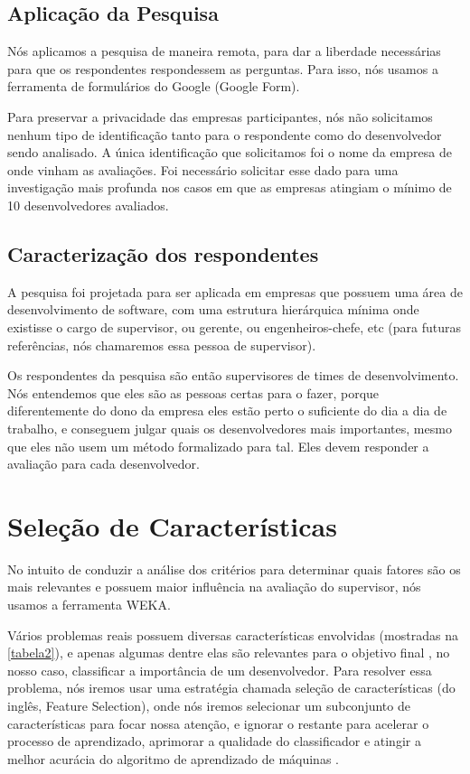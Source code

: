 \subsection{Aplicação da Pesquisa}

Nós aplicamos a pesquisa de maneira remota, para dar a liberdade necessárias para que os respondentes respondessem as perguntas. Para isso, nós usamos a ferramenta de formulários do Google (Google Form).

Para preservar a privacidade das empresas participantes, nós não solicitamos nenhum tipo de identificação tanto para o respondente como do desenvolvedor sendo analisado. A única identificação que solicitamos foi o nome da empresa de onde vinham as avaliações. Foi necessário solicitar esse dado para uma investigação mais profunda nos casos em que as empresas atingiam o mínimo de 10 desenvolvedores avaliados.

\subsection{Caracterização dos respondentes}

A pesquisa foi projetada para ser aplicada em empresas que possuem uma área de desenvolvimento de software, com uma estrutura hierárquica mínima onde existisse o cargo de supervisor, ou gerente, ou engenheiros-chefe, etc (para futuras referências, nós chamaremos essa pessoa de supervisor).

Os respondentes da pesquisa são então supervisores de times de desenvolvimento. Nós entendemos que eles são as pessoas certas para o fazer, porque diferentemente do dono da empresa eles estão perto o suficiente do dia a dia de trabalho, e conseguem julgar quais os desenvolvedores mais importantes, mesmo que eles não usem um método formalizado para tal. Eles devem responder a avaliação para cada desenvolvedor.
\section{Seleção de Características}\label{secao3.3}
No intuito de conduzir a análise dos critérios para determinar quais fatores são os mais relevantes e possuem maior influência na avaliação do supervisor, nós usamos a ferramenta WEKA\cite{Holmes}.

Vários problemas reais possuem diversas características envolvidas (mostradas na \autoref{tabela2}), e apenas algumas dentre elas são relevantes para o objetivo final \cite{Kira1992}, no nosso caso, classificar a importância de um desenvolvedor. Para resolver essa problema, nós iremos usar uma estratégia chamada seleção de características (do inglês, Feature Selection), onde nós iremos selecionar um subconjunto de características para focar nossa atenção, e ignorar o restante para acelerar o processo de aprendizado, aprimorar a qualidade do classificador e atingir a melhor acurácia do algoritmo de aprendizado de máquinas \cite{Kira1992,Kohavi1997}. 

